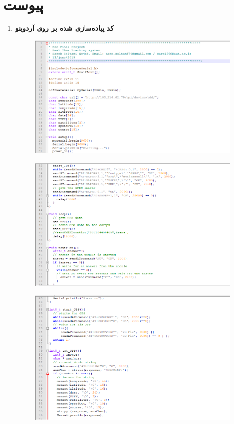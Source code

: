 \chapter*{‌پیوست}
\begin{enumerate}
	\item \textbf{کد پیاده‌سازی شده بر روی آردوینو}
	\\
	\begin{figure}[!h]
		\centerline{\includegraphics[width=1.1\textwidth]{code1}}
	\end{figure}
\newpage
	\begin{figure}[!h]
		\centerline{\includegraphics[width=1.1\textwidth]{code2}}
	\end{figure}
	\begin{figure}[!h]
		\centerline{\includegraphics[width=1.1\textwidth]{code3}}

\end{figure}
\end{enumerate}
